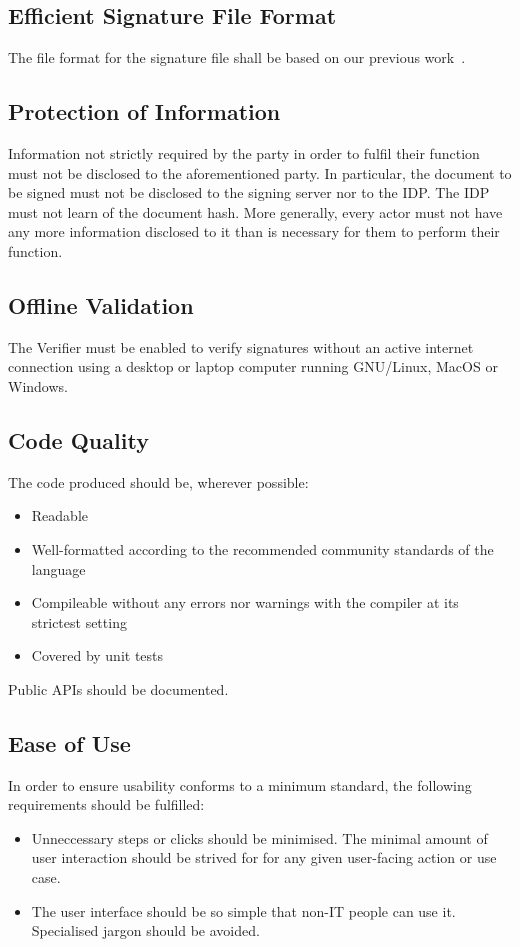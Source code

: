 \subsection{Efficient Signature File Format}\label{subsec:efficient-signature-file-format}
The file format for the signature file shall be based on our previous work~\cite{projekt2}.

\subsection{Protection of Information}\label{subsec:protection-of-information}
Information not strictly required by the party in order to fulfil their function must not be disclosed to the aforementioned party.
In particular, the document to be signed must not be disclosed to the signing server nor to the \gls{IDP}.
The \gls{IDP} must not learn of the document hash.
More generally, every actor must not have any more information disclosed to it than is necessary for them to perform their function.

\subsection{Offline Validation}\label{subsec:offline-validation}
The Verifier must be enabled to verify signatures without an active internet connection using a desktop or laptop computer running GNU/Linux, MacOS or Windows.

\subsection{Code Quality}\label{subsec:code-quality}
The code produced should be, wherever possible:
\begin{itemize}
    \item Readable
    \item Well-formatted according to the recommended community standards of the language
    \item Compileable without any errors nor warnings with the compiler at its strictest setting
    \item Covered by unit tests
\end{itemize}
Public \gls{API}s should be documented.

\subsection{Ease of Use}\label{subsec:ease-of-use}
In order to ensure usability conforms to a minimum standard, the following requirements should be fulfilled:
\begin{itemize}
    \item Unneccessary steps or clicks should be minimised. The minimal amount of user interaction should be strived for for any given user-facing action or use case.
    \item The user interface should be so simple that non-IT people can use it. Specialised jargon should be avoided.
\end{itemize}

